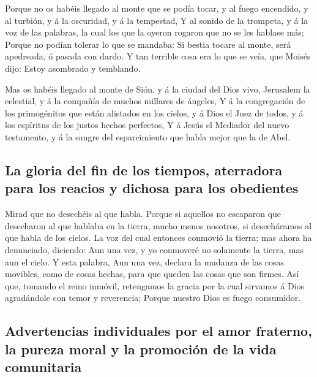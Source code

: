  Porque no os habéis llegado al monte que se podía tocar, y
al fuego encendido, y al turbión, y á la oscuridad, y á la tempestad,
 Y al sonido de la trompeta, y á la voz de las palabras, la
cual los que la oyeron rogaron que no se les hablase más; 
Porque no podían tolerar lo que se mandaba: Si bestia tocare al monte,
será apedreada, ó pasada con dardo.  Y tan terrible cosa
era lo que se veía, que Moisés dijo: Estoy asombrado y temblando.

 Mas os habéis llegado al monte de Sión, y á la ciudad del
Dios vivo, Jerusalem la celestial, y á la compañía de muchos millares de
ángeles,  Y á la congregación de los primogénitos que están
alistados en los cielos, y á Dios el Juez de todos, y á los espíritus de
los justos hechos perfectos,  Y á Jesús el Mediador del
nuevo testamento, y á la sangre del esparcimiento que habla mejor que la
de Abel.

\hypertarget{la-gloria-del-fin-de-los-tiempos-aterradora-para-los-reacios-y-dichosa-para-los-obedientes}{%
\subsection{La gloria del fin de los tiempos, aterradora para los
reacios y dichosa para los
obedientes}\label{la-gloria-del-fin-de-los-tiempos-aterradora-para-los-reacios-y-dichosa-para-los-obedientes}}

 Mirad que no desechéis al que habla. Porque si aquellos no
escaparon que desecharon al que hablaba en la tierra, mucho menos
nosotros, si desecháramos al que habla de los cielos.  La
voz del cual entonces conmovió la tierra; mas ahora ha denunciado,
diciendo: Aun una vez, y yo conmoveré no solamente la tierra, mas aun el
cielo.  Y esta palabra, Aun una vez, declara la mudanza de
las cosas movibles, como de cosas hechas, para que queden las cosas que
son firmes.  Así que, tomando el reino inmóvil, retengamos
la gracia por la cual sirvamos á Dios agradándole con temor y
reverencia;  Porque nuestro Dios es fuego consumidor.

\hypertarget{advertencias-individuales-por-el-amor-fraterno-la-pureza-moral-y-la-promociuxf3n-de-la-vida-comunitaria}{%
\subsection{Advertencias individuales por el amor fraterno, la pureza
moral y la promoción de la vida
comunitaria}\label{advertencias-individuales-por-el-amor-fraterno-la-pureza-moral-y-la-promociuxf3n-de-la-vida-comunitaria}}

